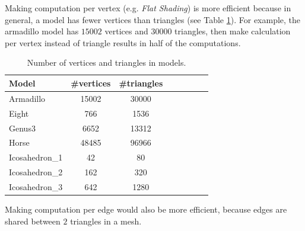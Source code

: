 Making computation per vertex (e.g. \textit{Flat Shading}) is more efficient because in general, a model has fewer vertices than triangles (see Table \ref{table:model-table-vertices}).
For example, the armadillo model has $15002$ vertices and $30000$ triangles, then make calculation per vertex instead of triangle results in half of the computations.

\begin{table}[!h]
    \centering
\begin{tabular}{l*{6}{c}r}
    \centering
    Model              & \#vertices & \#triangles \\
    \hline
    Armadillo          & 15002 & 30000 \\
    Eight              & 766 & 1536 \\
    Genus3             & 6652 & 13312  \\
    Horse              & 48485 &  96966\\
    Icosahedron\_1      &  42 & 80 \\
    Icosahedron\_2      &  162 & 320 \\
    Icosahedron\_3      & 642 &  1280
\end{tabular}
\caption{Number of vertices and triangles in models.}
\label{table:model-table-vertices}
\end{table}

Making computation per edge would also be more efficient, because edges are shared between $2$ triangles in a mesh.

